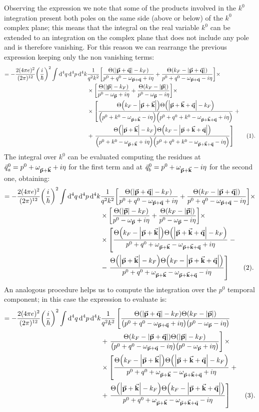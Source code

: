\documentclass[a4paper]{article}
\newcommand{\numberthis}{\addtocounter{equation}{1}\tag{\theequation}}
\newcommand{\Ta}{\Theta\pqty{\abs{\va{p}+\va{q}}-k_F}}
\newcommand{\Taa}{\Theta\pqty{k_F - \abs{\va{p}+\va{q}}}}
\newcommand{\Tb}{\Theta\pqty{\abs{\va{p} + \va{k} + \va{q}}-k_F}}
\newcommand{\Tbb}{\Theta\pqty{k_F - \abs{\va{p} + \va{k} + \va{q}}}}
\newcommand{\Tc}{\Theta\pqty{\abs{\va{p}+\va{k}}-k_F}}
\newcommand{\Tcc}{\Theta\pqty{k_F -\abs{\va{p}+\va{k}}}}
\newcommand{\Td}{\Theta\pqty{\abs{\va{p}}-k_F}}
\newcommand{\Tdd}{\Theta\pqty{k_F -\abs{\va{p}}}}
\begin{document}
Observing the expression we note that some of the products involved in the $k^0$ integration present both poles on the same side (above or below) of the $k^0$ complex plane; this means that the integral on the real variable $k^0$ can be extended to an integration on the complex plane that does not include any pole and is therefore vanishing.
For this reason we can rearrange the previous expression keeping only the non vanishing terms:
\begin{align*}
= -\frac{2(4\pi e)^2}{(2\pi)^{12}} \pqty{\frac{i}{\hbar}}^2 \int \dd[4]{q}\dd[4]{p}\dd[4]{k}&\frac{1}{q^2 k^2}
\bqty{\frac{\Ta}{p^0 +q^0 -\omega_{\va{p} + \va{q}} + i\eta} + \frac{\Taa}{p^0+q^0 -\omega_{\va{p}+\va{q}}-i\eta}}\times\\
&\times \bqty{\frac{\Td}{p^0 - \omega_{\va{p}}+i\eta} + \frac{\Tdd}{p^0 - \omega_{\va{p}}-i\eta} }\times\\
&\times \left[\frac{\Tcc\Tb}{\pqty{p^0+k^0 - \omega_{\va{p}+\va{k}}-i\eta}\pqty{p^0+q^0+k^0 - \omega_{\va{p}+\va{k}+\va{q}}+i\eta}} \right.+\\
&+\left. \frac{\Tc\Tbb}{\pqty{p^0+k^0 - \omega_{\va{p}+\va{k}}+i\eta}\pqty{p^0+q^0+k^0 - \omega_{\va{p}+\va{k}+\va{q}}-i\eta}}\right]\numberthis .
\end{align*}
The integral over $k^0$ can be evaluated computing the residues at $\bar{q}^0_a = p^0 +\omega_{\va{p}+\va{k}} +i\eta$ for the first term and at $\bar{q}^0_b = p^0 +\omega_{\va{p}+\va{k}} -i\eta$ for the second one, obtaining:
\begin{align*}
= -\frac{2(4\pi e)^2}{(2\pi)^{12}} \pqty{\frac{i}{\hbar}}^2 \int \dd[4]{q}\dd[4]{p}\dd[4]{k}&\frac{1}{q^2 k^2}
\bqty{\frac{\Ta}{p^0 +q^0 -\omega_{\va{p} + \va{q}} + i\eta} + \frac{\Taa}{p^0+q^0 -\omega_{\va{p}+\va{q}}-i\eta}}\times\\
&\times \bqty{\frac{\Td}{p^0 - \omega_{\va{p}}+i\eta} + \frac{\Tdd}{p^0 - \omega_{\va{p}}-i\eta} }\times\\
&\times \left[\frac{\Tcc\Tb}{p^0+q^0+ \omega_{\va{p}+\va{k}}- \omega_{\va{p}+\va{k}+\va{q}}+i\eta} \right.-\\
&-\left. \frac{\Tc\Tbb}{p^0+q^0+ \omega_{\va{p}+\va{k}}- \omega_{\va{p}+\va{k}+\va{q}}-i\eta}\right]\numberthis .
\end{align*}
An analogous procedure helps us to compute the integration over the $p^0$ temporal component; in this case the expression to evaluate is:
\begin{align*}
= -\frac{2(4\pi e)^2}{(2\pi)^{12}} \pqty{\frac{i}{\hbar}}^2 \int \dd[4]{q}\dd[4]{p}\dd[4]{k}&\frac{1}{q^2 k^2}
\left[\frac{\Ta\Tdd}{\pqty{p^0 +q^0 -\omega_{\va{p} + \va{q}} + i\eta}\pqty{ p^0 - \omega_{\va{p}}-i\eta}}\right.\\
& + \left.\frac{\Taa\Td}{\pqty{p^0 +q^0 -\omega_{\va{p} + \va{q}} - i\eta}\pqty{ p^0 - \omega_{\va{p}}+i\eta}}\right]\times\\
&\times \left[\frac{\Tcc\Tb}{p^0+q^0+ \omega_{\va{p}+\va{k}}- \omega_{\va{p}+\va{k}+\va{q}}+i\eta} \right.+\\
&+\left. \frac{\Tc\Tbb}{p^0+q^0+ \omega_{\va{p}+\va{k}}- \omega_{\va{p}+\va{k}+\va{q}}-i\eta}\right]\numberthis .
\end{align*}
\end{document}
